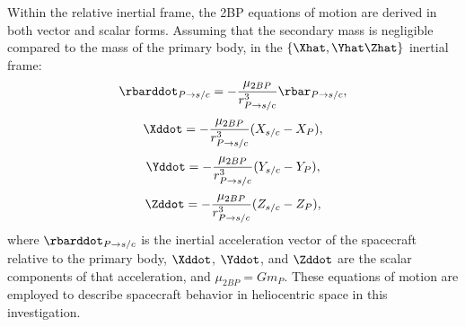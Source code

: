 Within the relative inertial frame, the 2BP equations of motion are derived in both vector and
scalar forms\cite{Vallado:2013,Canales:2021b}. Assuming that the secondary mass is negligible
compared to the mass of the primary body, in the $\{\Xhat,\Yhat\Zhat\}$ inertial frame:
\begin{equation}
    \rbarddot_{P\rightarrow s/c}=-\frac{\mu_{2BP}}{r_{P\rightarrow s/c}^{3}}\rbar_{P\rightarrow s/c},
    \label{eq:TBPEoM}
\end{equation}
\vspace{1mm}
\begin{equation}
    \Xddot=-\frac{\mu_{2BP}}{r_{P\rightarrow s/c}^{3}}(X_{s/c}-X_{P}),
    \label{eq:TBPEoMX}
\end{equation}
\vspace{1mm}
\begin{equation}
    \Yddot=-\frac{\mu_{2BP}}{r_{P\rightarrow s/c}^{3}}(Y_{s/c}-Y_{P}),
    \label{eq:TBPEoMY}
\end{equation}
\vspace{1mm}
\begin{equation}
    \Zddot=-\frac{\mu_{2BP}}{r_{P\rightarrow s/c}^{3}}(Z_{s/c}-Z_{P}),
    \label{eq:TBPEoMZ}
\end{equation}
where $\rbarddot_{P\rightarrow s/c}$ is the inertial acceleration vector of the spacecraft relative
to the primary body, $\Xddot$, $\Yddot$, and $\Zddot$ are the scalar components of that
acceleration, and $\mu_{2BP}=Gm_{P}$. These equations of motion are employed to describe spacecraft
behavior in heliocentric space in this investigation.


